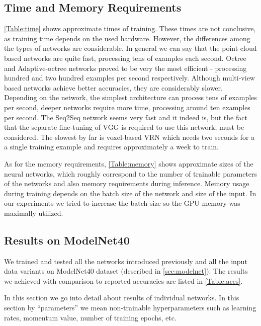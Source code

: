 \subsection{Time and Memory Requirements}
\autoref{Table:time} shows approximate times of training. These times are not conclusive, as training time depends on the used hardware. However, the differences among the types of networks are considerable. In general we can say that the point cloud based networks are quite fast, processing tens of examples each second. Octree and Adaptive-octree networks proved to be very the most efficient - processing hundred and two hundred examples per second respectively. Although multi-view based networks achieve better accuracies, they are considerably slower. Depending on the network, the simplest architecture can process tens of examples per second, deeper networks require more time, processing around ten examples per second. The Seq2Seq network seems very fast and it indeed is, but the fact that the separate fine-tuning of VGG is required to use this network, must be considered. The slowest by far is voxel-based VRN which needs two seconds for a a single training example and requires approximately a week to train. \par


As for the memory requirements, \autoref{Table:memory} shows approximate sizes of the neural networks, which roughly correspond to the number of trainable parameters of the networks and also memory requirements during inference. Memory usage during training depends on the batch size of the network and size of the input. In our experiments we tried to increase the batch size so the GPU memory was maximally utilized. 


\subsection{Results on ModelNet40}
We trained and tested all the networks introduced previously and all the input data variants on ModelNet40 dataset (described in \autoref{sec:modelnet}). The results we achieved with comparison to reported accuracies are listed in \autoref{Table:accs}. 

In this section we go into detail about results of individual networks. In this section by “parameters” we mean non-trainable hyperparameters such as learning rates, momentum value, number of training epochs, etc.

\def\myitem #1#2{
	\item { \textbf{#1} \par #2
	}
}

